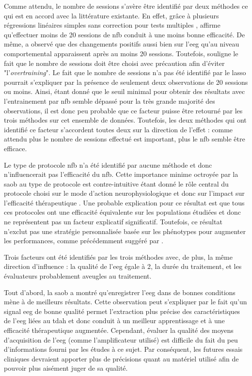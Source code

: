 Comme attendu, le nombre de sessions s'avère être identifié par deux méthodes ce qui est en accord avec la littérature existante. En effet, grâce à plusieurs régressions linéaires 
simples sans correction pour tests multiples \citep{Arns2009}, \citet{Arns2014} affirme qu'effectuer moins de 20 sessions de \gls{nfb} conduit à une moins bonne efficacité. De même,
\citet{Vernon2004} a observé que des changements positifs aussi bien sur l'\gls{eeg} qu'au niveau comportemental apparaissent après au moins 20 sessions. Toutefois, \citep{Enriquez2017}
souligne le fait que le nombre de sessions doit être choisi avec précaution afin d'éviter "l'\textit{overtraining}". Le fait que le nombre de sessions n'a pas été identifié par le \gls{lasso}
pourrait s'expliquer par la présence de seulement deux observations de 20 sessions ou moins. Ainsi, étant donné que le seuil minimal pour obtenir des résultats avec l'entrainement
par \gls{nfb} semble dépassé pour la très grande majorité des observations, il est donc peu probable que ce facteur puisse être retourné par les trois méthodes sur cet ensemble de données. 
Toutefois, les deux méthodes qui ont identifié ce facteur s'accordent toutes deux sur la direction de l'effet : comme attendu plus le nombre de sessions effectué est important, 
plus le \gls{nfb} semble être efficace. 

Le type de protocole \gls{nfb} n'a été identifié par aucune méthode et donc n'influencerait pas l'efficacité du \gls{nfb}. Cette importance minime octroyée par la \gls{saob} au type de protocole
est contre-intuitive étant donné le rôle central du protocole choisi sur le mode d'action neurophysiologique et donc sur l'impact sur l'efficacité thérapeutique \citep{Vernon2004}. Une probable 
explication pour ce résultat est que tous ces protocoles ont une efficacité équivalente sur les populations étudiées et donc ne représentent pas un facteur explicatif significatif. 
Toutefois, ce résultat n'exclut pas une stratégie personnalisée basée sur les phénotypes pour augmenter les performances, comme précédemment suggéré par \citet{Alkoby2017}.

Trois facteurs ont été identifiés par les trois méthodes avec, de plus, la même direction d'influence : la qualité de l'\gls{eeg} égale à 2, la durée du traitement, et les évaluateurs 
probablement aveugles au traitement. 

Tout d'abord, la \gls{saob} a montré qu'enregistrer l'\gls{eeg} dans de bonnes conditions mène à de meilleurs résultats. Cette observation peut s'expliquer par le fait qu'un signal
\gls{eeg} de bonne qualité permet l'extraction plus précise des caractéristiques de l'\gls{eeg} liées au \gls{tdah} et donc conduit à un meilleur apprentissage et 
à une efficacité thérapeutique augmentée. Cependant, évaluer la qualité des moyens d'acquisition de l'\gls{eeg} (comme l'amplificateur utilisé) 
est difficile du fait du peu d'informations fourni par les études à ce sujet. Par conséquent, les futures essais cliniques devraient apporter plus 
de précisions quant au matériel utilisé afin de pouvoir plus aisément juger de sa qualité. 

